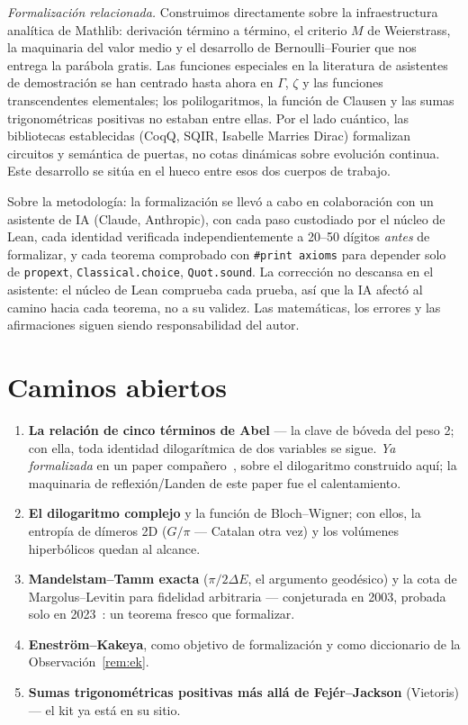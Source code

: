 \documentclass[11pt]{article}
\newcommand{\lean}[1]{\texttt{#1}}
\begin{document}
\emph{Formalizaci\'on relacionada.} Construimos directamente sobre la infraestructura
anal\'itica de Mathlib: derivaci\'on t\'ermino a t\'ermino, el criterio $M$ de
Weierstrass, la maquinaria del valor medio y el desarrollo de Bernoulli--Fourier que nos
entrega la par\'abola gratis. Las funciones especiales en la literatura de asistentes de
demostraci\'on se han centrado hasta ahora en $\Gamma$, $\zeta$ y las funciones
transcendentes elementales; los polilogaritmos, la funci\'on de Clausen y las sumas
trigonom\'etricas positivas no estaban entre ellas. Por el lado cu\'antico, las
bibliotecas establecidas (CoqQ, SQIR, Isabelle Marries Dirac) formalizan circuitos y
sem\'antica de puertas, no cotas din\'amicas sobre evoluci\'on continua. Este desarrollo
se sit\'ua en el hueco entre esos dos cuerpos de trabajo.

Sobre la metodolog\'ia: la formalizaci\'on se llev\'o a cabo en colaboraci\'on con un
asistente de IA (Claude, Anthropic), con cada paso custodiado por el n\'ucleo de Lean,
cada identidad verificada independientemente a 20--50 d\'igitos \emph{antes} de
formalizar, y cada teorema comprobado con \lean{\#print axioms} para depender solo de
\lean{propext}, \lean{Classical.choice}, \lean{Quot.sound}. La correcci\'on no descansa
en el asistente: el n\'ucleo de Lean comprueba cada prueba, as\'i que la IA afect\'o al
camino hacia cada teorema, no a su validez. Las matem\'aticas, los errores y las
afirmaciones siguen siendo responsabilidad del autor.

\section{Caminos abiertos}\label{sec:roads}

\begin{enumerate}
\item \textbf{La relaci\'on de cinco t\'erminos de Abel} --- la clave de b\'oveda del
peso 2; con ella, toda identidad dilogar\'itmica de dos variables se sigue. \emph{Ya
formalizada} en un paper compa\~nero~\cite{fiveterm}, sobre el dilogaritmo construido
aqu\'i; la maquinaria de reflexi\'on/Landen de este paper fue el calentamiento.
\item \textbf{El dilogaritmo complejo} y la funci\'on de Bloch--Wigner; con ellos, la
entrop\'ia de d\'imeros 2D ($G/\pi$ --- Catalan otra vez) y los vol\'umenes
hiperb\'olicos quedan al alcance.
\item \textbf{Mandelstam--Tamm exacta} ($\pi/2\Delta E$, el argumento geod\'esico) y la
cota de Margolus--Levitin para fidelidad arbitraria --- conjeturada en 2003, probada
solo en 2023~\cite{hornedal}: un teorema fresco que formalizar.
\item \textbf{Enestr\"om--Kakeya}, como objetivo de formalizaci\'on y como diccionario
de la Observaci\'on~\ref{rem:ek}.
\item \textbf{Sumas trigonom\'etricas positivas m\'as all\'a de Fej\'er--Jackson}
(Vietoris) --- el kit ya est\'a en su sitio.
\end{enumerate}
\end{document}
